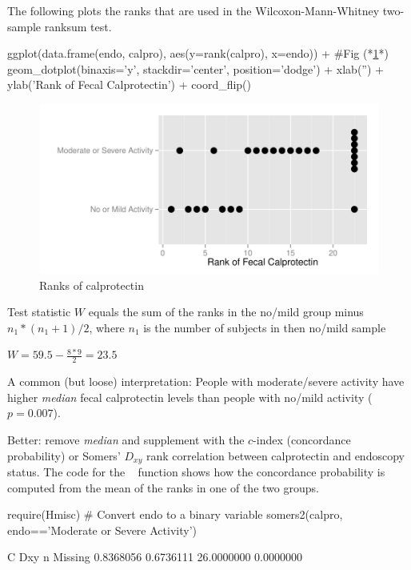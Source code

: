 The following plots the ranks that are used in the
Wilcoxon-Mann-Whitney two-sample ranksum test.
\begin{Schunk}
\begin{Sinput}
ggplot(data.frame(endo, calpro), aes(y=rank(calpro), x=endo)) + #Fig (*\ref{fig:nonpar-calpror}*)
  geom_dotplot(binaxis='y', stackdir='center', position='dodge') +
    xlab('') + ylab('Rank of Fecal Calprotectin') + coord_flip()
\end{Sinput}
\begin{figure}[htbp]

\centerline{\includegraphics{nonpar-calpror-1} }

\caption[Ranks of calprotectin]{Ranks of calprotectin}\label{fig:nonpar-calpror}
\end{figure}
\end{Schunk}
\bi
\item Test statistic $W$ equals the sum of the ranks in the no/mild group minus $n_1 * (n_1 + 1) / 2$, where $n_1$ is the number of subjects in then no/mild sample
\item $W = 59.5 - \frac{8*9}{2} = 23.5$
\item A common (but loose) interpretation: People with moderate/severe activity have higher \textit{median} fecal calprotectin levels than people with no/mild activity ($p = 0.007$).
\item Better: remove \textit{median} and supplement with the $c$-index
  (concordance probability) or Somers' $D_{xy}$ rank correlation
  between calprotectin and endoscopy status.  The code for the \R\
   function shows how the concordance probability is
  computed from the mean of the ranks in one of the two groups.
\ei
\begin{Schunk}
\begin{Sinput}
require(Hmisc)
# Convert endo to a binary variable
somers2(calpro, endo=='Moderate or Severe Activity')
\end{Sinput}
\begin{Soutput}
         C        Dxy          n    Missing 
 0.8368056  0.6736111 26.0000000  0.0000000 
\end{Soutput}
\end{Schunk}

